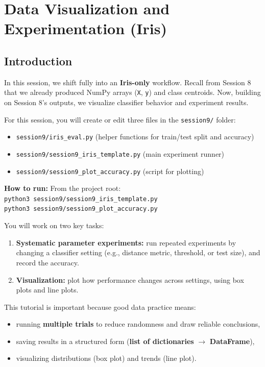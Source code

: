 \chapter{Data Visualization and Experimentation (Iris)}

\section{Introduction}
In this session, we shift fully into an \textbf{Iris-only} workflow.
Recall from Session 8 that we already produced NumPy arrays (\texttt{X}, \texttt{y}) and class centroids.
Now, building on Session 8's outputs, we visualize classifier behavior and experiment results.

\begin{tcolorbox}[title=You will work in]
For this session, you will create or edit three files in the \texttt{session9/} folder:
\begin{itemize}
    \item \texttt{session9/iris\_eval.py} (helper functions for train/test split and accuracy)
    \item \texttt{session9/session9\_iris\_template.py} (main experiment runner)
    \item \texttt{session9/session9\_plot\_accuracy.py} (script for plotting)
\end{itemize}
\textbf{How to run:} From the project root: \\
\texttt{python3 session9/session9\_iris\_template.py} \\
\texttt{python3 session9/session9\_plot\_accuracy.py}
\end{tcolorbox}

You will work on two key tasks:
\begin{enumerate}\setlength{\itemsep}{2pt}
\item \textbf{Systematic parameter experiments:} run repeated experiments by changing a classifier setting (e.g., distance metric, threshold, or test size), and record the accuracy.
\item \textbf{Visualization:} plot how performance changes across settings, using box plots and line plots.
\end{enumerate}

\noindent
This tutorial is important because good data practice means:
\begin{itemize}\setlength{\itemsep}{0pt}
\item running \textbf{multiple trials} to reduce randomness and draw reliable conclusions,
\item saving results in a structured form (\textbf{list of dictionaries} $\rightarrow$ \textbf{DataFrame}),
\item visualizing distributions (box plot) and trends (line plot).
\end{itemize}

